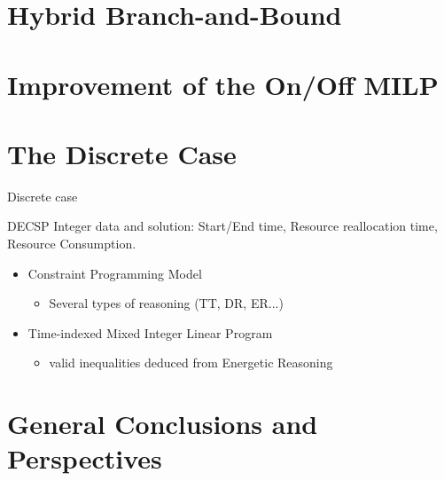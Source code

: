 \documentclass{beamer}
\begin{document}
\section{Hybrid Branch-and-Bound}


\section{Improvement of the On/Off MILP}


\section{The Discrete Case}
\begin{frame}{Discrete case}
  \vfill
  \begin{block}{DECSP}
    Integer data and solution: Start/End time, Resource reallocation
    time, Resource Consumption.
  \end{block}
  \vfill
\pause
  \begin{itemize}
  \item Constraint Programming Model
    \begin{itemize}
    \item Several types of reasoning (TT, DR, ER...)
    \end{itemize}
    \vfill
\pause
  \item Time-indexed Mixed Integer Linear Program
    \begin{itemize}
    \item valid inequalities deduced from Energetic Reasoning
    \end{itemize}
  \end{itemize}
  \vfill
\end{frame}
\section{General Conclusions and Perspectives}
\end{document}
